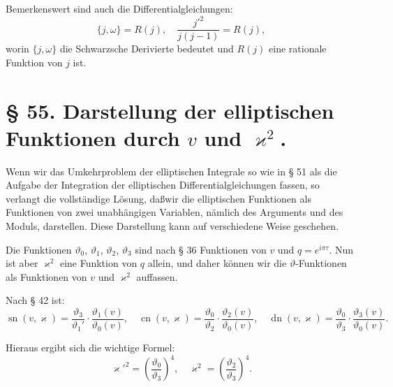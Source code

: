 \documentclass[12pt,a4paper]{article}
\theoremstyle{definition}
\begin{document}
Bemerkenswert sind auch die Differentialgleichungen:
\begin{equation}\tag{9}
\{j, \omega\} = R(j), \quad \frac{j'^2}{j(j-1)} = R(j),
\end{equation}
worin $\{j, \omega\}$ die Schwarzsche Derivierte bedeutet und $R(j)$
eine rationale Funktion von $j$ ist.

\section*{\S{} 55. Darstellung der elliptischen Funktionen durch $v$ und $\varkappa^2$.}

Wenn wir das Umkehrproblem der elliptischen Integrale so
wie in \S{} 51 als die Aufgabe der Integration der elliptischen
Differentialgleichungen fassen, so verlangt die vollst\"{a}ndige L\"{o}sung,
da\ss wir die elliptischen Funktionen als Funktionen von zwei
unabh\"{a}ngigen Variablen, n\"{a}mlich des Arguments und des Moduls,
darstellen. Diese Darstellung kann auf verschiedene Weise geschehen.

Die Funktionen $\vartheta_0$, $\vartheta_1$, $\vartheta_2$, $\vartheta_3$ sind nach \S{} 36
Funktionen von $v$ und $q = e^{i\pi\tau}$. Nun ist aber $\varkappa^2$ eine Funktion
von $q$ allein, und daher k\"{o}nnen wir die $\vartheta$-Funktionen als
Funktionen von $v$ und $\varkappa^2$ auffassen.

Nach \S{} 42 ist:
\begin{equation}\tag{1}
\operatorname{sn}(v, \varkappa) = \frac{\vartheta_3}{\vartheta_1'} \cdot \frac{\vartheta_1(v)}{\vartheta_0(v)}, \quad
\operatorname{cn}(v, \varkappa) = \frac{\vartheta_0}{\vartheta_2} \cdot \frac{\vartheta_2(v)}{\vartheta_0(v)}, \quad
\operatorname{dn}(v, \varkappa) = \frac{\vartheta_0}{\vartheta_3} \cdot \frac{\vartheta_3(v)}{\vartheta_0(v)}.
\end{equation}

Hieraus ergibt sich die wichtige Formel:
\begin{equation}\tag{2}
\varkappa'^2 = \left(\frac{\vartheta_0}{\vartheta_3}\right)^4, \quad
\varkappa^2 = \left(\frac{\vartheta_2}{\vartheta_3}\right)^4.
\end{equation}
\end{document}
